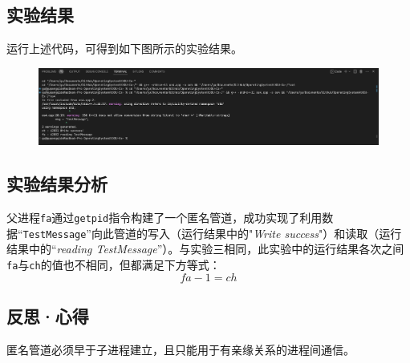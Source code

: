 \documentclass[UTF8]{ctexart}
\begin{document}
\subsection{实验结果}
运行上述代码，可得到如下图所示的实验结果。
\begin{figure}[htbp]
	\begin{center}
		\includegraphics[width=0.8\pdfpagewidth]{os4.png}
	\end{center}
\end{figure}
\subsection{实验结果分析}
父进程\texttt{fa}通过\texttt{getpid}指令构建了一个匿名管道，成功实现了利用数据“\texttt{TestMessage}”向此管道的写入（运行结果中的"\textit{Write success}"）和读取（运行结果中的“\textit{reading TestMessage}”）。与实验三相同，此实验中的运行结果各次之间\texttt{fa}与\texttt{ch}的值也不相同，但都满足下方等式：
\begin{equation}
	fa - 1 = ch
\end{equation}
\subsection{反思·心得}
匿名管道必须早于子进程建立，且只能用于有亲缘关系的进程间通信。
\end{document}
